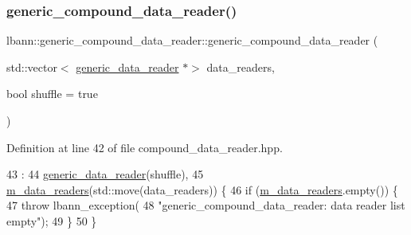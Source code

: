 \subsubsection{\texorpdfstring{generic\+\_\+compound\+\_\+data\+\_\+reader()}{generic\_compound\_data\_reader()}\hspace{0.1cm}{\footnotesize\ttfamily [1/2]}}
{\footnotesize\ttfamily lbann\+::generic\+\_\+compound\+\_\+data\+\_\+reader\+::generic\+\_\+compound\+\_\+data\+\_\+reader (\begin{DoxyParamCaption}\item[{std\+::vector$<$ \hyperlink{classlbann_1_1generic__data__reader}{generic\+\_\+data\+\_\+reader} $\ast$$>$}]{data\+\_\+readers,  }\item[{bool}]{shuffle = {\ttfamily true} }\end{DoxyParamCaption})\hspace{0.3cm}{\ttfamily [inline]}}



Definition at line 42 of file compound\+\_\+data\+\_\+reader.\+hpp.


\begin{DoxyCode}
43                                                    :
44     \hyperlink{classlbann_1_1generic__data__reader_aaba933b8f7c1227801f6e80d39986af4}{generic\_data\_reader}(shuffle),
45     \hyperlink{classlbann_1_1generic__compound__data__reader_a9815e94ade5873415fd766e09d956d5b}{m\_data\_readers}(std::move(data\_readers)) \{
46     \textcolor{keywordflow}{if} (\hyperlink{classlbann_1_1generic__compound__data__reader_a9815e94ade5873415fd766e09d956d5b}{m\_data\_readers}.empty()) \{
47       \textcolor{keywordflow}{throw} lbann\_exception(
48         \textcolor{stringliteral}{"generic\_compound\_data\_reader: data reader list empty"});
49     \}
50   \}
\end{DoxyCode}
\mbox{\label{classlbann_1_1generic__compound__data__reader_ae047b146f674bc806418f8db64c47bee}} 
